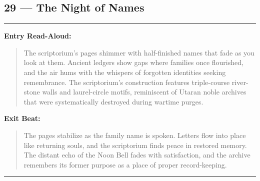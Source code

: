 \documentclass[18pt, letterpaper, twoside]{article}
\newenvironment{floorbox}[1]{%
    \begin{center}
    \begin{minipage}{0.95\textwidth}
    \subsection*{#1}
    \vspace{-0.5em}
    \rule{\textwidth}{0.5pt}
    \vspace{0.5em}
}{%
    \vspace{0.5em}
    \rule{\textwidth}{0.5pt}
    \end{minipage}
    \end{center}
}
\newenvironment{boxedtext}[1]{%
    \vspace{0.5em}
    \noindent\textbf{#1}
    \begin{quote}
}{%
    \end{quote}
    \vspace{0.5em}
}
\newcommand{\entrytext}[1]{\begin{boxedtext}{Entry Read-Aloud:} #1 \end{boxedtext}}
\newcommand{\exittext}[1]{\begin{boxedtext}{Exit Beat:} #1 \end{boxedtext}}
\begin{document}
\begin{floorbox}{29 --- The Night of Names}
    \entrytext{The scriptorium's pages shimmer with half-finished names that fade as you look at them. Ancient ledgers show gaps where families once flourished, and the air hums with the whispers of forgotten identities seeking remembrance. The scriptorium's construction features triple-course river-stone walls and laurel-circle motifs, reminiscent of Utaran noble archives that were systematically destroyed during wartime purges.}
    
    \exittext{The pages stabilize as the family name is spoken. Letters flow into place like returning souls, and the scriptorium finds peace in restored memory. The distant echo of the Noon Bell fades with satisfaction, and the archive remembers its former purpose as a place of proper record-keeping.}
    \end{floorbox}
    
\end{document}
